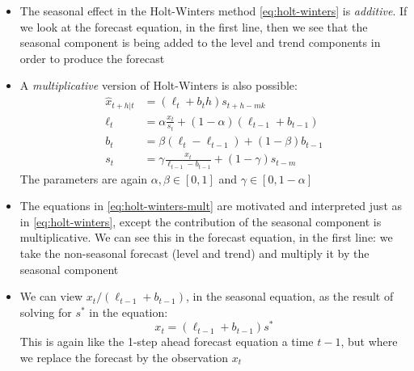 \documentclass{article}
\begin{document}
\begin{itemize}
\item The seasonal effect in the Holt-Winters method \eqref{eq:holt-winters} is
  \emph{additive}. If we look at the forecast equation, in the first line, then
  we see that the seasonal component is being added to the level and trend  
  components in order to produce the forecast 

\item A \emph{multiplicative} version of Holt-Winters is also possible:
  \begin{equation}
  \label{eq:holt-winters-mult}
  \begin{aligned}
  \hat{x}_{t+h | t} &= (\ell_t + b_t h) s_{t+h-mk} \\   
  \ell_t &= \alpha \frac{x_t}{s_t} + (1-\alpha) (\ell_{t-1} + b_{t-1}) \\ 
  b_t &= \beta (\ell_t - \ell_{t-1}) + (1-\beta) b_{t-1} \\
  s_t &= \gamma \frac{x_t}{\ell_{t-1} - b_{t-1}} + (1-\gamma) s_{t-m} 
  \end{aligned}
  \end{equation}
  The parameters are again $\alpha, \beta \in [0,1]$ and $\gamma \in [0,
  1-\alpha]$  

\item The equations in \eqref{eq:holt-winters-mult} are motivated and
  interpreted just as in \eqref{eq:holt-winters}, except the contribution of the
  seasonal component is multiplicative. We can see this in the forecast
  equation, in the first line: we take the non-seasonal forecast (level and
  trend) and multiply it by the seasonal component 

\item We can view $x_t / (\ell_{t-1} +  b_{t-1})$, in the seasonal equation, as
  the result of solving for $s^*$ in the equation: 
  \[
  x_t = (\ell_{t-1} + b_{t-1}) s^*
  \]
  This is again like the 1-step ahead forecast equation a time $t-1$, but where
  we replace the forecast  by the observation $x_t$
\end{itemize}


\end{document}
